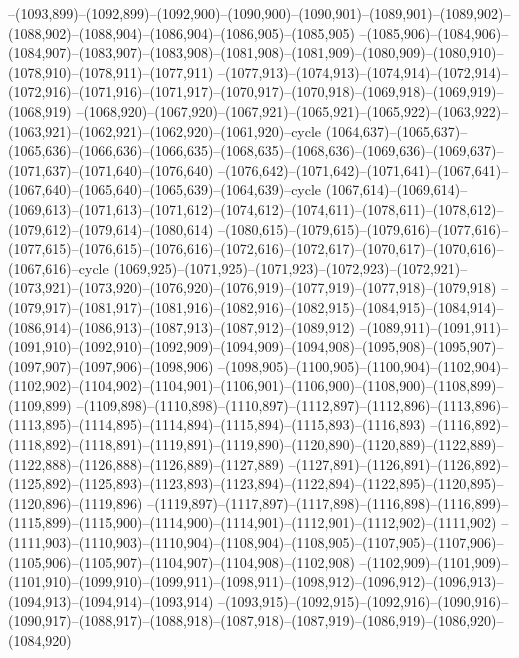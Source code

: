 --(1093,899)--(1092,899)--(1092,900)--(1090,900)--(1090,901)--(1089,901)--(1089,902)--(1088,902)--(1088,904)--(1086,904)--(1086,905)--(1085,905)
--(1085,906)--(1084,906)--(1084,907)--(1083,907)--(1083,908)--(1081,908)--(1081,909)--(1080,909)--(1080,910)--(1078,910)--(1078,911)--(1077,911)
--(1077,913)--(1074,913)--(1074,914)--(1072,914)--(1072,916)--(1071,916)--(1071,917)--(1070,917)--(1070,918)--(1069,918)--(1069,919)--(1068,919)
--(1068,920)--(1067,920)--(1067,921)--(1065,921)--(1065,922)--(1063,922)--(1063,921)--(1062,921)--(1062,920)--(1061,920)--cycle
(1064,637)--(1065,637)--(1065,636)--(1066,636)--(1066,635)--(1068,635)--(1068,636)--(1069,636)--(1069,637)--(1071,637)--(1071,640)--(1076,640)
--(1076,642)--(1071,642)--(1071,641)--(1067,641)--(1067,640)--(1065,640)--(1065,639)--(1064,639)--cycle
(1067,614)--(1069,614)--(1069,613)--(1071,613)--(1071,612)--(1074,612)--(1074,611)--(1078,611)--(1078,612)--(1079,612)--(1079,614)--(1080,614)
--(1080,615)--(1079,615)--(1079,616)--(1077,616)--(1077,615)--(1076,615)--(1076,616)--(1072,616)--(1072,617)--(1070,617)--(1070,616)--(1067,616)--cycle
(1069,925)--(1071,925)--(1071,923)--(1072,923)--(1072,921)--(1073,921)--(1073,920)--(1076,920)--(1076,919)--(1077,919)--(1077,918)--(1079,918)
--(1079,917)--(1081,917)--(1081,916)--(1082,916)--(1082,915)--(1084,915)--(1084,914)--(1086,914)--(1086,913)--(1087,913)--(1087,912)--(1089,912)
--(1089,911)--(1091,911)--(1091,910)--(1092,910)--(1092,909)--(1094,909)--(1094,908)--(1095,908)--(1095,907)--(1097,907)--(1097,906)--(1098,906)
--(1098,905)--(1100,905)--(1100,904)--(1102,904)--(1102,902)--(1104,902)--(1104,901)--(1106,901)--(1106,900)--(1108,900)--(1108,899)--(1109,899)
--(1109,898)--(1110,898)--(1110,897)--(1112,897)--(1112,896)--(1113,896)--(1113,895)--(1114,895)--(1114,894)--(1115,894)--(1115,893)--(1116,893)
--(1116,892)--(1118,892)--(1118,891)--(1119,891)--(1119,890)--(1120,890)--(1120,889)--(1122,889)--(1122,888)--(1126,888)--(1126,889)--(1127,889)
--(1127,891)--(1126,891)--(1126,892)--(1125,892)--(1125,893)--(1123,893)--(1123,894)--(1122,894)--(1122,895)--(1120,895)--(1120,896)--(1119,896)
--(1119,897)--(1117,897)--(1117,898)--(1116,898)--(1116,899)--(1115,899)--(1115,900)--(1114,900)--(1114,901)--(1112,901)--(1112,902)--(1111,902)
--(1111,903)--(1110,903)--(1110,904)--(1108,904)--(1108,905)--(1107,905)--(1107,906)--(1105,906)--(1105,907)--(1104,907)--(1104,908)--(1102,908)
--(1102,909)--(1101,909)--(1101,910)--(1099,910)--(1099,911)--(1098,911)--(1098,912)--(1096,912)--(1096,913)--(1094,913)--(1094,914)--(1093,914)
--(1093,915)--(1092,915)--(1092,916)--(1090,916)--(1090,917)--(1088,917)--(1088,918)--(1087,918)--(1087,919)--(1086,919)--(1086,920)--(1084,920)
